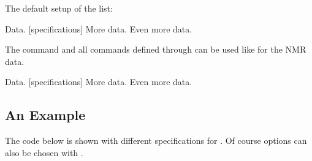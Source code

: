 \documentclass{chemmacros-manual}
\begin{document}
The default setup of the list:
\begin{sourcecode}
  \topsep\z@skip \partopsep\z@skip 
  \itemsep\z@ \parsep\z@ \itemindent\z@
  \leftmargin\z@
\end{sourcecode}

\begin{example}
  \begin{experimental}[format=\bfseries]
     Data.
    [specifications] More data.
     Even more data.
  \end{experimental}
\end{example}

The command  and all commands defined through 
can be used like  for the NMR data.

\begin{example}
  \begin{experimental}[format=\bfseries,use-equal]
     Data.
    [specifications] More data.
    \NMR Even more data.
  \end{experimental}
\end{example}

\subsection{An Example}
The code below is shown with different specifications for .
Of course options can also be chosen with .
\end{document}

